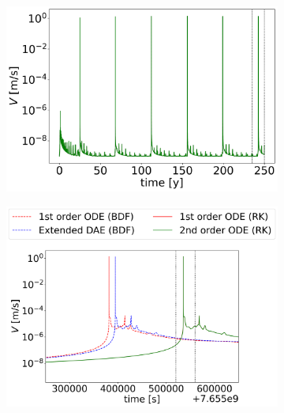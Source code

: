 \begin{figure}[H]
	\centering
	\begin{subfigure}[b]{0.325\textwidth}
		\centering 
		\includegraphics[width=1\textwidth]{images/TANDEMtimeEvolution_3D_maxSlipRate_allFormulations.png}
	\end{subfigure} 
	\begin{subfigure}[b]{0.32\textwidth}
		\centering
		\includegraphics[width=1.18\textwidth]{images/TANDEMtimeEvolution_3D_maxSlipRate_allFormulations_LastEarthquake.png}
	\end{subfigure}

\end{figure}
